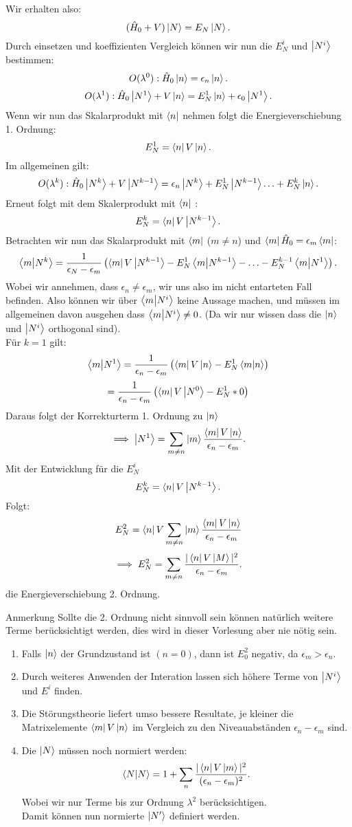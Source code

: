 \documentclass{report}
\begin{document}
Wir erhalten also: \[
	(\hat{H}_0 + V) \ket{N} = E_N \ket{N} 
.\] Durch einsetzen und koeffizienten Vergleich können wir nun die $E_N^i$ und $\ket{N^i} $ bestimmen: \[
O(\lambda^0): \hat{H}_0\ket{n} = \epsilon_n\ket{n} 
.\] \[
O(\lambda^1): \hat{H}_0\ket{N^1} + V\ket{n} = E_N^1\ket{n} + \epsilon_0\ket{N^1} 
.\] Wenn wir nun das Skalarprodukt mit $\bra{n} $ nehmen folgt die Energieverschiebung 1. Ordnung: \[
E_N^1 = \bra{n} V \ket{n} 
.\] Im allgemeinen gilt: \[
O(\lambda^k): \hat{H}_0 \ket{N^k} + V \ket{N^{k-1}} = \epsilon_n \ket{N^k} + E_N^1\ket{N^{k-1}} \ldots + E_N^k \ket{n}  
.\] Erneut folgt mit dem Skalerprodukt mit $\bra{n} $ : \[
E_N^k = \bra{n} V \ket{N^{k-1}} 
.\] Betrachten wir nun das Skalarprodukt mit $\bra{m} $ ($m \neq n$) und $\bra{m} \hat{H}_0 = \epsilon_m \bra{m}$: \[
\bra{m} \ket{N^k} = \frac{1}{\epsilon_N - \epsilon_m} \left( \bra{m} V \ket{N^{k-1}} - E_N^1 \bra{m} \ket{N^{k-1}} - \ldots - E_N^{k-1} \bra{m} \ket{N^1}  \right) 
.\] Wobei wir annehmen, dass  $\epsilon_n \neq \epsilon_m$, wir uns also im nicht entarteten Fall befinden. Also können wir über $\bra{m} \ket{N^i} $ keine Aussage machen, und müssen im allgemeinen davon ausgehen dass $\bra{m} \ket{N^i} \neq  0$. (Da wir nur wissen dass die $\ket{n} $ und $\ket{N^i} $ orthogonal sind). 
\\ Für $k=1$ gilt: \[
	\bra{m} \ket{N^1} = \frac{1}{\epsilon_n - \epsilon_m} \left( \bra{m} V\ket{n} - E_N^1 \bra{m} \ket{n}  \right) 
\]\[
= \frac{1}{\epsilon_n - \epsilon_m} \left( \bra{m} V \ket{N^0} - E_N^1 *0 \right) 
\] Daraus folgt der Korrekturterm 1. Ordnung zu $\ket{n} $ \[
\implies \ket{N^1} = \sum_{m \neq n} \ket{m} \frac{\bra{m} V \ket{n} }{\epsilon_n - \epsilon_m}
.\] Mit der Entwicklung für die $E_N^i$ \[
E_N^k = \bra{n} V \ket{N^{k-1}} 
.\]  Folgt: \[
E_N^2 = \bra{n} V \sum_{m \neq n} \ket{m} \frac{\bra{m} V \ket{n}}{\epsilon_n - \epsilon_m} 
\] \[
\implies E_N^2 = \sum_{m \neq n} \frac{|\bra{n} V \ket{M}|^2 }{\epsilon_n - \epsilon_m}
.\] die Energieverschiebung 2. Ordnung.\\
\begin{graybox}{Anmerkung}
	Sollte die 2. Ordnung nicht sinnvoll sein können natürlich weitere Terme berücksichtigt werden, dies wird in dieser Vorlesung aber nie nötig sein.
\end{graybox}
\begin{enumerate}
	\item Falls $\ket{n} $ der Grundzustand ist $(n=0)$, dann ist $E_0^2$ negativ, da  $\epsilon_m > \epsilon_n$.
	\item Durch weiteres Anwenden der Interation lassen sich höhere Terme von $\ket{N^i} $ und $E^i$ finden.
	\item Die Störungstheorie liefert umso bessere Resultate, je kleiner die Matrixelemente $\bra{m} V \ket{n} $ im Vergleich zu den Niveauabständen $\epsilon_n - \epsilon_m$ sind.
	\item Die $\ket{N} $ müssen noch normiert werden: \[
			\bra{N} \ket{N}  = 1 + \sum_{n} \frac{|\bra{n} V \ket{m} |^2}{(\epsilon_n-\epsilon_m)^2}
	.\] Wobei wir nur Terme bis zur Ordnung $\lambda^2$ berücksichtigen. \\
	Damit können nun normierte $\ket{N'} $ definiert werden.
\end{enumerate}
\end{document}
